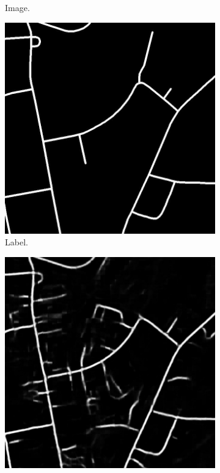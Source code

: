 \begin{figure}[H]
\begin{subfigure}{0.23\textwidth}
\caption{ Image.}
\vspace{0.2cm} %
\end{subfigure}
\hspace*{\fill} %
\begin{subfigure}{0.23\textwidth}
\includegraphics[width=\textwidth]{figs/appendix/label11728825_15.jpg}
\caption{Label.}
\vspace{0.2cm} %
\end{subfigure}
\hspace*{\fill} %
\begin{subfigure}{0.23\textwidth}
\includegraphics[width=\textwidth]{figs/appendix/pred11728825_15.jpg}

\end{subfigure}
\end{figure}

